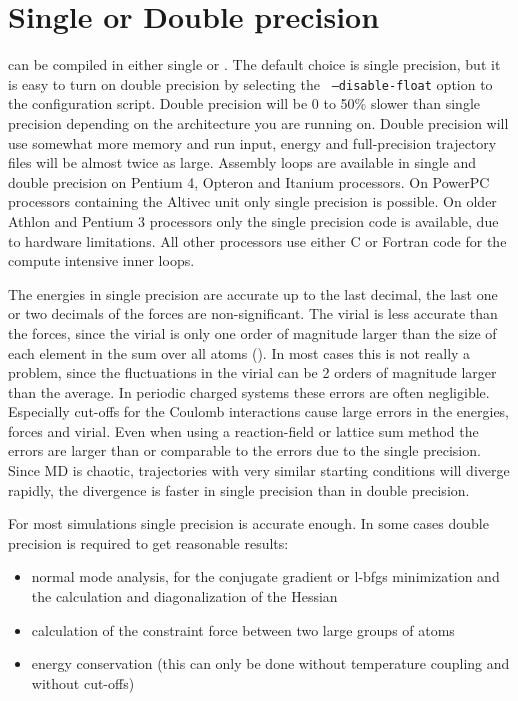 \section{Single or Double precision}
{\gromacs} can be compiled in either single or
. The default choice is single precision,
but it is easy to turn on double precision by selecting the {\tt
--disable-float} option to the configuration script.  Double precision
will be 0 to 50\% slower than single precision depending on the
architecture you are running on. Double precision will use somewhat
more memory and run input, energy and full-precision trajectory files
will be almost twice as large.  Assembly loops are available in single
and double precision on Pentium 4, Opteron and Itanium processors.  On
PowerPC processors containing the Altivec unit only single precision
is possible. On older Athlon and Pentium 3 processors only the single
precision code is available, due to hardware limitations. All other
processors use either C or Fortran code for the compute intensive
inner loops.

The energies in single precision are accurate up to the last decimal,
the last one or two decimals of the forces are non-significant.
The virial is less accurate than the forces, since the virial is only one
order of magnitude larger than the size of each element in the sum over
all atoms ().
In most cases this is not really a problem, since the fluctuations in the
virial can be 2 orders of magnitude larger than the average.
In periodic charged systems these errors are often negligible.
Especially cut-offs for the Coulomb interactions cause large errors
in the energies, forces and virial.
Even when using a reaction-field or lattice sum method the errors
are larger than or comparable to the errors due to the single precision.
Since MD is chaotic, trajectories with very similar starting conditions will
diverge rapidly, the divergence is faster in single precision than in double
precision.

For most simulations single precision is accurate enough.
In some cases double precision is required to get reasonable results:
\begin{itemize}
\item normal mode analysis,
for the conjugate gradient or l-bfgs minimization and the calculation and
diagonalization of the Hessian
\item calculation of the constraint force between two large groups of atoms
\item energy conservation (this can only be done without temperature coupling
and without cut-offs)
\end{itemize}

